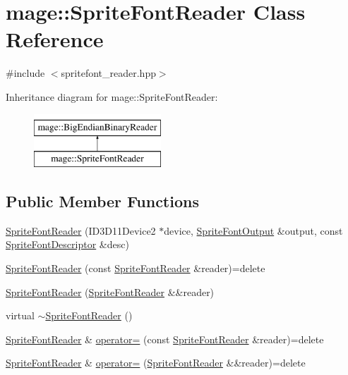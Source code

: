 \hypertarget{classmage_1_1_sprite_font_reader}{}\section{mage\+:\+:Sprite\+Font\+Reader Class Reference}
\label{classmage_1_1_sprite_font_reader}


{\ttfamily \#include $<$spritefont\+\_\+reader.\+hpp$>$}

Inheritance diagram for mage\+:\+:Sprite\+Font\+Reader\+:\begin{figure}[H]
\begin{center}
\leavevmode
\includegraphics[height=2.000000cm]{classmage_1_1_sprite_font_reader}
\end{center}
\end{figure}
\subsection*{Public Member Functions}
\begin{DoxyCompactItemize}
\item 
\hyperlink{classmage_1_1_sprite_font_reader_ab257bc3c1f787182c14da56545ff6d10}{Sprite\+Font\+Reader} (I\+D3\+D11\+Device2 $\ast$device, \hyperlink{structmage_1_1_sprite_font_output}{Sprite\+Font\+Output} \&output, const \hyperlink{structmage_1_1_sprite_font_descriptor}{Sprite\+Font\+Descriptor} \&desc)
\item 
\hyperlink{classmage_1_1_sprite_font_reader_a81f2b8ceab31ea5006d2bef498a03bbc}{Sprite\+Font\+Reader} (const \hyperlink{classmage_1_1_sprite_font_reader}{Sprite\+Font\+Reader} \&reader)=delete
\item 
\hyperlink{classmage_1_1_sprite_font_reader_aa75a98a2573636fa9e1cde4fbe9c1b93}{Sprite\+Font\+Reader} (\hyperlink{classmage_1_1_sprite_font_reader}{Sprite\+Font\+Reader} \&\&reader)
\item 
virtual \hyperlink{classmage_1_1_sprite_font_reader_ac2c18498abf115d296c0314845562481}{$\sim$\+Sprite\+Font\+Reader} ()
\item 
\hyperlink{classmage_1_1_sprite_font_reader}{Sprite\+Font\+Reader} \& \hyperlink{classmage_1_1_sprite_font_reader_a4de55b4bebfabb5f1c32078864baef11}{operator=} (const \hyperlink{classmage_1_1_sprite_font_reader}{Sprite\+Font\+Reader} \&reader)=delete
\item 
\hyperlink{classmage_1_1_sprite_font_reader}{Sprite\+Font\+Reader} \& \hyperlink{classmage_1_1_sprite_font_reader_aae3c6305ea97146bd85b2d93a037d47d}{operator=} (\hyperlink{classmage_1_1_sprite_font_reader}{Sprite\+Font\+Reader} \&\&reader)=delete
\end{DoxyCompactItemize}
